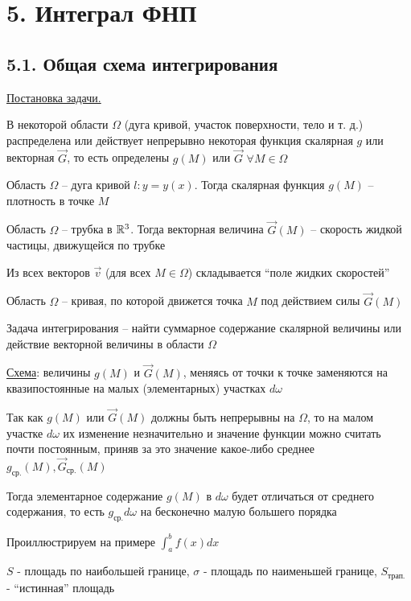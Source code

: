 \documentclass[12pt]{article}
\begin{document}
    \clearpage

    \section{5. Интеграл ФНП}

    \subsection{5.1. Общая схема интегрирования}

    \underline{Постановка задачи.}

    В некоторой области $\Omega$ (дуга кривой, участок поверхности, тело и т. д.)
    распределена или действует непрерывно некоторая функция скалярная $g$ или векторная $\vec{G}$,
    то есть определены $g(M)$ или $\vec{G}$ $\forall M \in \Omega$

    \Ex Область $\Omega$ -- дуга кривой $l : y = y(x)$. Тогда скалярная функция $g(M)$ -- плотность в точке $M$

    \Exs Область $\Omega$ -- трубка в $\mathbb{R}^3$. Тогда векторная величина $\vec{G}(M)$ -- скорость жидкой частицы, движущейся по трубке

    Из всех векторов $\vec{v}$ (для всех $M \in \Omega$) складывается \enquote{поле жидких скоростей}

    \Exs Область $\Omega$ -- кривая, по которой движется точка $M$ под действием силы $\vec{G}(M)$

    \mediumvspace

    Задача интегрирования -- найти суммарное содержание скалярной величины или действие векторной величины в области $\Omega$

    \underline{Схема}: величины $g(M)$ и $\vec{G}(M)$, меняясь от точки к точке заменяются на квазипостоянные на малых (элементарных) участках $d\omega$

    Так как $g(M)$ или $\vec{G}(M)$ должны быть непрерывны на $\Omega$, то на малом участке $d\omega$ их изменение незначительно и
    значение функции можно считать почти постоянным, приняв за это значение какое-либо среднее $g_{\text{ср.}}(M), \vec{G}_{\text{ср.}}(M)$

    Тогда элементарное содержание $g(M)$ в $d\omega$ будет отличаться от среднего содержания, то есть $g_{\text{ср.}}d\omega$ на бесконечно малую большего порядка

    \Ex Проиллюстрируем на примере $\int_a^b f(x) dx$

    $S$ - площадь по наибольшей границе, $\sigma$ - площадь по наименьшей границе, $S_{\text{трап.}}$ - \enquote{истинная} площадь
\end{document}
